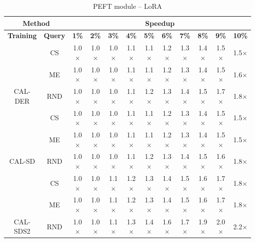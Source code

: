 \begin{table}[htbp]
\centering
\begin{subtable}{\linewidth}
\centering
\caption{PEFT module -- Adapter}

\begin{tabular}{c|c|cccccccccc}
\toprule
\multicolumn{2}{c|}{\textbf{Method}} & \multicolumn{10}{c}{\textbf{Speedup}} \\
\midrule
\textbf{Training} & \textbf{Query} & \textbf{1\%} & \textbf{2\%} & \textbf{3\%} & \textbf{4\%} & \textbf{5\%} & \textbf{6\%} & \textbf{7\%} & \textbf{8\%} & \textbf{9\%} & \textbf{10\%}\\
\midrule
 & CS & 1.0$\times$ & 1.0$\times$ & 1.0$\times$ & 1.1$\times$ & 1.1$\times$ & 1.2$\times$ & 1.3$\times$ & 1.4$\times$ & 1.5$\times$ & 1.5$\times$\\

 & ME & 1.0$\times$ & 1.0$\times$ & 1.0$\times$ & 1.1$\times$ & 1.1$\times$ & 1.2$\times$ & 1.3$\times$ & 1.4$\times$ & 1.5$\times$ & 1.6$\times$\\

\multirow{-3}{*}{\raggedright\arraybackslash CAL-DER} & RND & 1.0$\times$ & 1.0$\times$ & 1.0$\times$ & 1.1$\times$ & 1.2$\times$ & 1.3$\times$ & 1.4$\times$ & 1.5$\times$ & 1.7$\times$ & 1.8$\times$\\
\midrule
 & CS & 1.0$\times$ & 1.0$\times$ & 1.0$\times$ & 1.1$\times$ & 1.1$\times$ & 1.2$\times$ & 1.3$\times$ & 1.4$\times$ & 1.5$\times$ & 1.5$\times$\\

 & ME & 1.0$\times$ & 1.0$\times$ & 1.0$\times$ & 1.1$\times$ & 1.1$\times$ & 1.2$\times$ & 1.3$\times$ & 1.4$\times$ & 1.5$\times$ & 1.5$\times$\\

\multirow{-3}{*}{\raggedright\arraybackslash CAL-SD} & RND & 1.0$\times$ & 1.0$\times$ & 1.0$\times$ & 1.1$\times$ & 1.2$\times$ & 1.3$\times$ & 1.4$\times$ & 1.5$\times$ & 1.6$\times$ & 1.8$\times$\\
\midrule
 & CS & 1.0$\times$ & 1.0$\times$ & 1.1$\times$ & 1.2$\times$ & 1.3$\times$ & 1.4$\times$ & 1.5$\times$ & 1.6$\times$ & 1.7$\times$ & 1.8$\times$\\

 & ME & 1.0$\times$ & 1.0$\times$ & 1.1$\times$ & 1.2$\times$ & 1.3$\times$ & 1.4$\times$ & 1.5$\times$ & 1.6$\times$ & 1.7$\times$ & 1.8$\times$\\

\multirow{-3}{*}{\raggedright\arraybackslash CAL-SDS2} & RND & 1.0$\times$ & 1.0$\times$ & 1.1$\times$ & 1.3$\times$ & 1.4$\times$ & 1.6$\times$ & 1.7$\times$ & 1.9$\times$ & 2.0$\times$ & 2.2$\times$\\
\bottomrule
\end{tabular}
\end{subtable}
\vspace{1em}
\begin{subtable}{\linewidth}
\centering
\caption{PEFT module -- LoRA}


\end{subtable}
\end{table}
